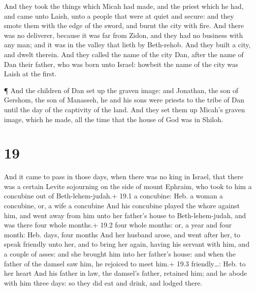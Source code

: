  And they took the things which Micah had made, and the
priest which he had, and came unto Laish, unto a people that were at
quiet and secure: and they smote them with the edge of the sword, and
burnt the city with fire.  And there was no deliverer,
because it was far from Zidon, and they had no business with any man;
and it was in the valley that lieth by Beth-rehob. And they built a
city, and dwelt therein.  And they called the name of the
city Dan, after the name of Dan their father, who was born unto Israel:
howbeit the name of the city was Laish at the first.

 ¶ And the children of Dan set up the graven image: and
Jonathan, the son of Gershom, the son of Manasseh, he and his sons were
priests to the tribe of Dan until the day of the captivity of the land.
 And they set them up Micah's graven image, which he made,
all the time that the house of God was in Shiloh.

\hypertarget{section-18}{%
\section{19}\label{section-18}}

 And it came to pass in those days, when there was no king
in Israel, that there was a certain Levite sojourning on the side of
mount Ephraim, who took to him a concubine out of Beth-lehem-judah.+
19.1 a concubine: Heb. a woman a concubine, or, a wife a concubine
 And his concubine played the whore against him, and went
away from him unto her father's house to Beth-lehem-judah, and was there
four whole months.+ 19.2 four whole months: or, a year and four month:
Heb. days, four months  And her husband arose, and went
after her, to speak friendly unto her, and to bring her again, having
his servant with him, and a couple of asses: and she brought him into
her father's house: and when the father of the damsel saw him, he
rejoiced to meet him.+ 19.3 friendly\ldots: Heb. to her heart
 And his father in law, the damsel's father, retained him;
and he abode with him three days: so they did eat and drink, and lodged
there.

